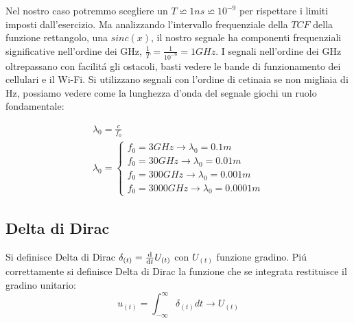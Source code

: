                 Nel nostro caso potremmo scegliere un $T\backsimeq 1ns \backsimeq 10^{-9}$ per rispettare i limiti imposti dall'esercizio.
                Ma analizzando l'intervallo frequenziale della $TCF$ della funzione rettangolo, una $sinc(x)$, il nostro segnale ha componenti
                frequenziali significative nell'ordine dei GHz, $\frac{1}{T}= \frac{1}{10^{-9}} = 1GHz$. I segnali nell'ordine dei GHz oltrepassano con facilitá
                gli ostacoli, basti vedere le bande di funzionamento dei cellulari e il Wi-Fi. Si utilizzano segnali con l'ordine di cetinaia se non migliaia di Hz, 
                possiamo vedere come la lunghezza d'onda del segnale giochi un ruolo fondamentale:
                
                \begin{gather}
                        \lambda_0 = \frac{c}{f_0} \nonumber \\
                        \lambda_0 = \begin{cases}
                            f_0 = 3GHz \rightarrow \lambda_0 = 0.1m \nonumber \\
                            f_0 = 30GHz \rightarrow \lambda_0 = 0.01m \nonumber \\
                            f_0 = 300GHz \rightarrow \lambda_0 = 0.001m \nonumber \\
                            f_0 = 3000GHz \rightarrow \lambda_0 = 0.0001m \nonumber 
                        \end{cases}\nonumber
                \end{gather}

    \subsection{Delta di Dirac}\label{Delta di Dirac}
        Si definisce Delta di Dirac $\delta_{(t)} = \derivative{}{t}U_{(t)}$ con $U_{(t)}$ funzione gradino.
        Piú correttamente si definisce Delta di Dirac la funzione che se integrata restituisce il gradino unitario:
        \[
            u_{(t)} = \int_{-\infty}^{\infty} \delta_{(t)} dt \rightarrow U_{(t)}
        \]

